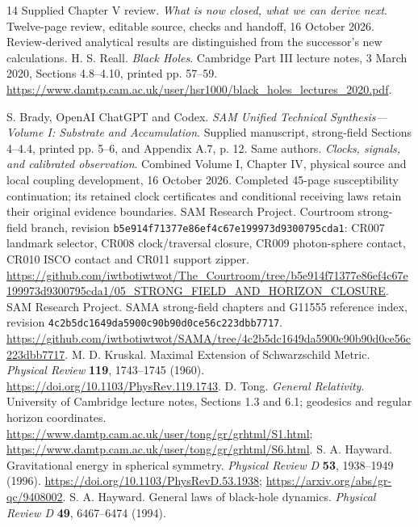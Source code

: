 \documentclass[10pt,twocolumn,letterpaper]{article}
\begin{document}
\begin{thebibliography}{14}
\small
\setlength{\itemsep}{1pt}
\setlength{\parskip}{0pt}
 Supplied Chapter V review.
\emph{What is now closed, what we can derive next}. Twelve-page review,
editable source, checks and handoff, 16 October 2026. Review-derived
analytical results are distinguished from the successor's new calculations.
 H. S. Reall. \emph{Black Holes}. Cambridge Part III
lecture notes, 3 March 2020, Sections 4.8--4.10, printed pp. 57--59.
\url{https://www.damtp.cam.ac.uk/user/hsr1000/black_holes_lectures_2020.pdf}.\small
\raggedright
{} S. Brady, OpenAI ChatGPT and Codex.
\emph{SAM Unified Technical Synthesis---Volume I: Substrate and
Accumulation}. Supplied manuscript, strong-field Sections 4--4.4,
printed pp. 5--6, and Appendix A.7, p. 12.
 Same authors. \emph{Clocks, signals, and calibrated
observation}. Combined Volume I, Chapter IV, physical source and local
coupling development, 16 October 2026. Completed 45-page susceptibility continuation;
its retained clock certificates and conditional receiving laws
retain their original evidence boundaries.
 SAM Research Project. Courtroom strong-field
branch, revision \texttt{b5e914f71377e86ef4c67e199973d9300795cda1}:
CR007 landmark selector, CR008 clock/traversal closure, CR009
photon-sphere contact, CR010 ISCO contact and CR011 support zipper.
\url{https://github.com/iwtbotiwtwot/The_Courtroom/tree/b5e914f71377e86ef4c67e199973d9300795cda1/05_STRONG_FIELD_AND_HORIZON_CLOSURE}.
 SAM Research Project. SAMA strong-field chapters and
G11555 reference index, revision
\texttt{4c2b5dc1649da5900c90b90d0ce56c223dbb7717}.
\url{https://github.com/iwtbotiwtwot/SAMA/tree/4c2b5dc1649da5900c90b90d0ce56c223dbb7717}.
 M. D. Kruskal. Maximal Extension of Schwarzschild
Metric. \emph{Physical Review} \textbf{119}, 1743--1745 (1960).
\url{https://doi.org/10.1103/PhysRev.119.1743}.
 D. Tong. \emph{General Relativity}. University of
Cambridge lecture notes, Sections 1.3 and 6.1; geodesics and regular
horizon coordinates.
\url{https://www.damtp.cam.ac.uk/user/tong/gr/grhtml/S1.html};
\url{https://www.damtp.cam.ac.uk/user/tong/gr/grhtml/S6.html}.
 S. A. Hayward. Gravitational energy in spherical
symmetry. \emph{Physical Review D} \textbf{53}, 1938--1949 (1996).
\url{https://doi.org/10.1103/PhysRevD.53.1938};
\url{https://arxiv.org/abs/gr-qc/9408002}.
\newpage
{} S. A. Hayward. General laws of black-hole
dynamics. \emph{Physical Review D} \textbf{49}, 6467--6474 (1994).

\end{thebibliography}
\end{document}
